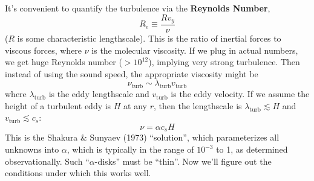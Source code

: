 \documentclass[10pt]{article}
\numberwithin{equation}{section}
\newcommand{\n}{\noindent}
\begin{document}
	\n It's convenient to quantify the turbulence via the \textbf{Reynolds Number},
	\begin{equation}
		\label{eq:disk:4} R_e \equiv \frac{Rv_y}{\nu}
	\end{equation}
	($R$ is some characteristic lengthscale). This is the ratio of inertial forces to viscous forces, where $\nu$ is the molecular viscosity. If we plug in actual numbers, we get huge Reynolds number ($>10^{12}$), implying very strong turbulence. Then instead of using the sound speed, the appropriate viscosity might be
	\begin{equation}
		\label{eq:disk:5} \nu_{\mathrm{turb}} \sim \lambda_{\mathrm{turb}}v_{\mathrm{turb}}
	\end{equation}
	where $\lambda_{\mathrm{turb}}$ is the eddy lengthscale and $v_{\mathrm{turb}}$ is the eddy velocity. If we assume the height of a turbulent eddy is $H$ at any $r$, then the lengthscale is $\lambda_{\mathrm{turb}}\lesssim H$ and $v_{\mathrm{turb}}\lesssim c_s$:
	\begin{equation}
		\label{eq:disk:6} \nu = \alpha c_s H
	\end{equation}
	This is the Shakura \& Sunyaev (1973) ``solution'', which parameterizes all unknowns into $\alpha$, which is typically in the range of $10^{-3}$ to 1, as determined observationally. Such ``$\alpha$-disks'' must be ``thin''. Now we'll figure out the conditions under which this works well.
	
\end{document}
